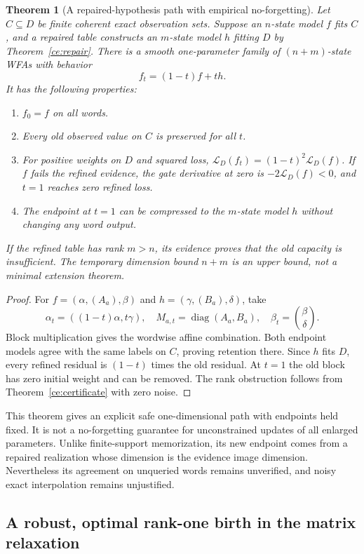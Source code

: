 \documentclass[11pt]{article}
\newtheorem{theorem}{Theorem}[section]
\theoremstyle{definition}
\theoremstyle{remark}
\begin{document}
\begin{theorem}[A repaired-hypothesis path with empirical no-forgetting]
\label{ce:reconstructed-gate}
Let $C\subseteq D$ be finite coherent exact observation sets. Suppose an
$n$-state model $f$ fits $C$, and a repaired table constructs an $m$-state
model $h$ fitting $D$ by Theorem~\ref{ce:repair}. There is a smooth
one-parameter family of $(n+m)$-state WFAs with behavior
\[
 f_t=(1-t)f+th.
\]
It has the following properties:
\begin{enumerate}
\item $f_0=f$ on all words.
\item Every old observed value on $C$ is preserved for all $t$.
\item For positive weights on $D$ and squared loss,
$\mathcal L_D(f_t)=(1-t)^2\mathcal L_D(f)$.
If $f$ fails the refined evidence, the gate derivative at zero is
$-2\mathcal L_D(f)<0$, and $t=1$ reaches zero refined loss.
\item The endpoint at $t=1$ can be compressed to the $m$-state model
$h$ without changing any word output.
\end{enumerate}
If the refined table has rank $m>n$, its evidence proves that the old
capacity is insufficient. The temporary dimension bound $n+m$ is an
upper bound, not a minimal extension theorem.
\end{theorem}
\begin{proof}
For $f=(\alpha,(A_a),\beta)$ and
$h=(\gamma,(B_a),\delta)$, take
\[
 \alpha_t=((1-t)\alpha,t\gamma),\quad
 M_{a,t}=\operatorname{diag}(A_a,B_a),\quad
 \beta_t=\binom\beta\delta.
\]
Block multiplication gives the wordwise affine combination. Both endpoint
models agree with the same labels on $C$, proving retention there.
Since $h$ fits $D$, every refined residual is $(1-t)$ times the old
residual. At $t=1$ the old block has zero initial weight and can be
removed. The rank obstruction follows from Theorem~\ref{ce:certificate}
with zero noise.
\end{proof}

This theorem gives an explicit safe one-dimensional path with endpoints
held fixed. It is not a no-forgetting guarantee for unconstrained updates
of all enlarged parameters. Unlike finite-support memorization, its new
endpoint comes from a repaired realization whose dimension is the evidence
image dimension. Nevertheless its agreement on unqueried words remains
unverified, and noisy exact interpolation remains unjustified.

\subsection{A robust, optimal rank-one birth in the matrix relaxation}
\end{document}
